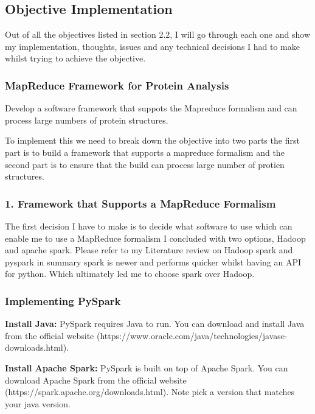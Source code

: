 \documentclass[]{final_report}
\begin{document}
\subsection{Objective Implementation}

Out of all the objectives listed in section 2.2, I will go through each one and show my implementation, thoughts, issues and any technical decisions I had to make whilst trying to achieve the objective.

\subsubsection{MapReduce Framework for Protein Analysis}

\begin{displayquote}
    Develop a software framework that suppots the Mapreduce formalism and can process
    large numbers of protein structures.
\end{displayquote}

To implement this we need to break down the objective into two parts the first part is to build a framework that supports a mapreduce formalism and the second part is to ensure that the build can process large number of protien structures. 

\subsubsection{1. Framework that Supports a MapReduce Formalism}

The first decision I have to make is to decide what software to use which can enable me to use a MapReduce formalism I concluded with two options, Hadoop and apache spark. Please refer to my Literature review on Hadoop spark and pyspark in summary spark is newer and performs quicker whilst having an API for python. Which ultimately led me to choose spark over Hadoop.

\clearpage

\subsubsection{Implementing PySpark}

\textbf{Install Java:} PySpark requires Java to run. You can download and install Java from the official website (https://www.oracle.com/java/technologies/javase-downloads.html).

\textbf{Install Apache Spark:} PySpark is built on top of Apache Spark. You can download Apache Spark from the official website (https://spark.apache.org/downloads.html). Note pick a version that matches your java version.
\end{document}
